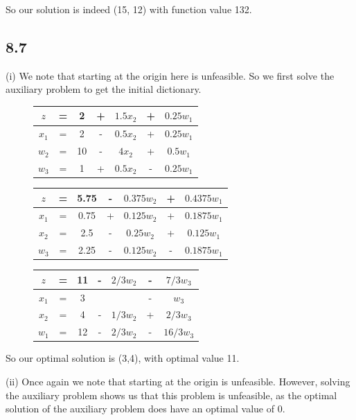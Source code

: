\documentclass{article}
\begin{document}
	So our solution is indeed (15, 12) with function value 132.
		
	\subsection*{8.7}
	(i) We note that starting at the origin here is unfeasible. So we first solve the auxiliary problem to get the initial dictionary.

	\begin{figure}[!h]
		\begin{tabular}{c c c c c c c}
			$z$ & = & 2 & + & $1.5 x_2 $ & + & $0.25 w_1$ \\
			\hline
			$x_1$ & = & 2 & - &$0.5x_2 $& + &$0.25 w_1$ \\
			$w_2$ & = & 10 & - & $4 x_2 $ & + & $0.5 w_1$ \\
			$w_3$ & = & 1 & + & $0.5 x_2$ & - & $0.25 w_1 $ \\
			\hline
		\end{tabular}
	\end{figure}
	
	\begin{figure}[!h]
		\begin{tabular}{c c c c c c c}
			$z$ & = & 5.75 & - & $0.375w_2 $ & + & $0.4375 w_1$ \\
			\hline
			$x_1$ & = & 0.75 & + &$0.125 w_2$& + &$0.1875w_1$ \\
			$x_2$ & = & 2.5 & - & $0.25 w_2 $ & + & $0.125 w_1$ \\
			$w_3$ & = & 2.25 & - & $0.125 w_2$ & - & $0.1875 w_1 $ \\
			\hline
		\end{tabular}
	\end{figure}	
	 
	 \begin{figure}[!h]
	 	\begin{tabular}{c c c c c c c}
	 		$z$ & = & 11 & - & $2/3 w_2 $ & - & $7/3 w_3$ \\
	 		\hline
	 		$x_1$ & = & 3 &  && - &$w_3$ \\
	 		$x_2$ & = & 4 & - & $1/3 w_2 $ & + & $2/3 w_3$ \\
	 		$w_1$ & = & 12 & - & $2/3 w_2$ & - & $16/3 w_3 $ \\
	 		\hline
	 	\end{tabular}
	 \end{figure}	
	 So our optimal solution is (3,4), with optimal value 11. 
	 
	 (ii) Once again we note that starting at the origin is unfeasible. However, solving the auxiliary problem shows us that this problem is unfeasible, as the optimal solution of the auxiliary problem does have an optimal value of 0.
	 
\end{document}
